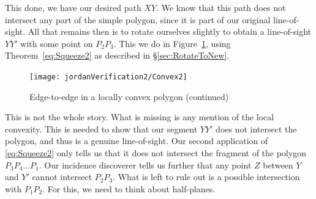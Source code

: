 
\linebreak

This done, we have our desired path $XY$. We know that this path does not intersect any part of the simple polygon, since it is part of our original line-of-sight. All that remains then is to rotate ourselves slightly to obtain a line-of-sight $YY'$ with some point on $P_2P_3$. This we do in Figure~\ref{fig:Convex2}, using Theorem~\ref{eq:Squeeze2} as described in \S\ref{sec:RotateToNew}. 

\begin{figure}
\centering\texttt{[image: jordanVerification2/Convex2]}
\caption{Edge-to-edge in a locally convex polygon (continued)}
\label{fig:Convex2}
\end{figure}

This is not the whole story. What is missing is any mention of the local convexity. This is needed to show that our segment $YY'$ does not intersect the polygon, and thus is a genuine line-of-sight. Our second application of \eqref{eq:Squeeze2} only tells us that it does not intersect the fragment of the polygon $P_3P_4\ldots P_1$. Our incidence discoverer tells us further that any point $Z$ between $Y$ and $Y'$ cannot intersect $P_2P_3$. What is left to rule out is a possible intersection with $P_1P_2$. For this, we need to think about half-planes. 

